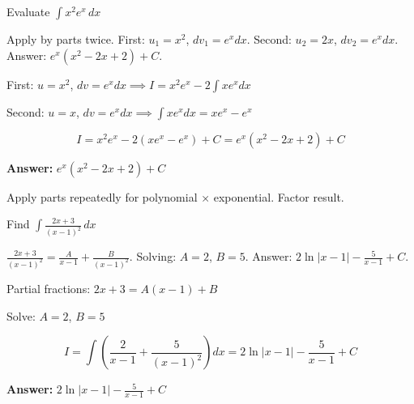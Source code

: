 
\begin{problem}
Evaluate $\displaystyle \int x^2 e^x \, dx$
\end{problem}

\begin{hint}
Apply by parts twice. First: $u_1 = x^2$, $dv_1 = e^x dx$. Second: $u_2 = 2x$, $dv_2 = e^x dx$. Answer: $e^x(x^2 - 2x + 2) + C$.
\end{hint}

\begin{solution}
First: $u=x^2$, $dv=e^xdx \implies I = x^2e^x - 2\int xe^xdx$

Second: $u=x$, $dv=e^xdx \implies \int xe^xdx = xe^x - e^x$

\[
I = x^2e^x - 2(xe^x - e^x) + C = e^x(x^2 - 2x + 2) + C
\]

\textbf{Answer:} $\boxed{e^x(x^2-2x+2) + C}$
\end{solution}

\begin{takeaways}
Apply parts repeatedly for polynomial × exponential. Factor result.
\end{takeaways}

\vspace{1cm}

\begin{problem}
Find $\displaystyle \int \frac{2x + 3}{(x-1)^2} \, dx$
\end{problem}

\begin{hint}
$\frac{2x+3}{(x-1)^2} = \frac{A}{x-1} + \frac{B}{(x-1)^2}$. Solving: $A=2$, $B=5$. Answer: $2\ln|x-1| - \frac{5}{x-1} + C$.
\end{hint}

\begin{solution}
Partial fractions: $2x+3 = A(x-1) + B$

Solve: $A=2$, $B=5$

\[
I = \int\left(\frac{2}{x-1} + \frac{5}{(x-1)^2}\right)dx = 2\ln|x-1| - \frac{5}{x-1} + C
\]

\textbf{Answer:} $\boxed{2\ln|x-1| - \frac{5}{x-1} + C}$
\end{solution}

